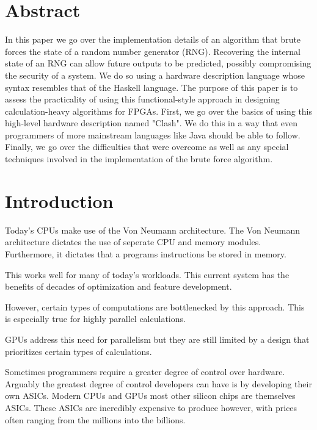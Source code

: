 \documentclass{article}
\begin{document}
    \begin{multicols}{2}

    \section*{Abstract}

    In this paper we go over the implementation details of an algorithm that brute forces
    the state of a random number generator (RNG). Recovering the internal state of an RNG can allow
    future outputs to be predicted, possibly compromising the security of a system.
    We do so using a hardware description language whose syntax
    resembles that of the Haskell language.
    The purpose of this paper is to assess the practicality of using this functional-style approach in
    designing calculation-heavy algorithms for FPGAs.
    First, we go over the basics of using this high-level hardware description named "Clash".
    We do this in a way that even programmers of more mainstream languages like Java should be able to follow.
    Finally, we go over the difficulties that were overcome as well as any special techniques involved in
    the implementation of the brute force algorithm.

    \section{Introduction}

    Today's CPUs make use of the Von Neumann architecture. The Von Neumann architecture dictates the use
    of seperate CPU and memory modules. Furthermore, it dictates that a programs instructions be stored
    in memory.

    This works well for many of today's workloads. This current system has the benefits of decades of optimization
    and feature development.

    However, certain types of computations are bottlenecked by this approach. This is especially true for
    highly parallel calculations.

    GPUs address this need for parallelism but they are still limited by a design that prioritizes
    certain types of calculations.

    Sometimes programmers require a greater degree of control over hardware. Arguably the greatest degree
    of control developers can have is by developing their own ASICs. Modern CPUs and GPUs most
    other silicon chips are themselves ASICs. These ASICs are incredibly expensive to produce however,
    with prices often ranging from the millions into the billions.


\end{multicols}
\end{document}
